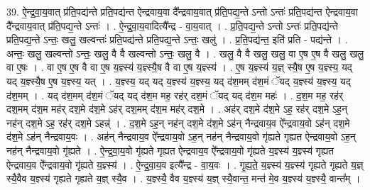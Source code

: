 \documentclass[17pt]{extarticle}
\begin{document}
39. ऐ॒न्द्र॒वा॒य॒वात् प्र॑ति॒पद्य॑न्ते प्रति॒पद्य॑न्त ऐन्द्रवाय॒वा दै᳚न्द्रवाय॒वात् प्र॑ति॒पद्य॒न्ते ऽन्तो ऽन्तः॑ प्रति॒पद्य॑न्त ऐन्द्रवाय॒वा दै᳚न्द्रवाय॒वात् प्र॑ति॒पद्य॒न्ते ऽन्तः॑ । . ऐ॒न्द्र॒वा॒य॒वादित्यै᳚न्द्र - वा॒य॒वात् । . प्र॒ति॒पद्य॒न्ते ऽन्तो ऽन्तः॑ प्रति॒पद्य॑न्ते प्रति॒पद्य॒न्ते ऽन्तः॒ खलु॒ खल्वन्तः॑ प्रति॒पद्य॑न्ते प्रति॒पद्य॒न्ते ऽन्तः॒ खलु॑ । . प्र॒ति॒पद्य॑न्त॒ इति॑ प्रति - पद्य॑न्ते । . अन्तः॒ खलु॒ खल्वन्तो ऽन्तः॒ खलु॒ वै वै खल्वन्तो ऽन्तः॒ खलु॒ वै । . खलु॒ वै वै खलु॒ खलु॒ वा ए॒ष ए॒ष वै खलु॒ खलु॒ वा ए॒षः । . वा ए॒ष ए॒ष वै वा ए॒ष य॒ज्ञ्स्य॑ य॒ज्ञ्स्यै॒ष वै वा ए॒ष य॒ज्ञ्स्य॑ । . ए॒ष य॒ज्ञ्स्य॑ य॒ज्ञ् स्यै॒ष ए॒ष य॒ज्ञ्स्य॒ यद् यद् य॒ज्ञ्स्यै॒ष ए॒ष य॒ज्ञ्स्य॒ यत् । . य॒ज्ञ्स्य॒ यद् यद् य॒ज्ञ्स्य॑ य॒ज्ञ्स्य॒ यद् द॑श॒मम् द॑श॒मं ॅयद् य॒ज्ञ्स्य॑ य॒ज्ञ्स्य॒ यद् द॑श॒मम् । . यद् द॑श॒मम् द॑श॒मं ॅयद् यद् द॑श॒म मह॒ रह॑र् दश॒मं ॅयद् यद् द॑श॒म महः॑ । . द॒श॒म मह॒ रह॑र् दश॒मम् द॑श॒म मह॑र् दश॒मे द॑श॒मे ऽह॑र् दश॒मम् द॑श॒म मह॑र् दश॒मे । . अह॑र् दश॒मे द॑श॒मे ऽह॒ रह॑र् दश॒मे ऽह॒न् नह॑न् दश॒मे ऽह॒ रह॑र् दश॒मे ऽहन्न्॑ । . द॒श॒मे ऽह॒न् नह॑न् दश॒मे द॑श॒मे ऽह॑न् नैन्द्रवाय॒व ऐ᳚न्द्रवाय॒वो ऽह॑न् दश॒मे द॑श॒मे ऽह॑न् नैन्द्रवाय॒वः । . अह॑न् नैन्द्रवाय॒व ऐ᳚न्द्रवाय॒वो ऽह॒न् नह॑न् नैन्द्रवाय॒वो गृ॑ह्यते गृह्यत ऐन्द्रवाय॒वो ऽह॒न् नह॑न् नैन्द्रवाय॒वो गृ॑ह्यते । . ऐ॒न्द्र॒वा॒य॒वो गृ॑ह्यते गृह्यत ऐन्द्रवाय॒व ऐ᳚न्द्रवाय॒वो गृ॑ह्यते य॒ज्ञ्स्य॑ य॒ज्ञ्स्य॑ गृह्यत ऐन्द्रवाय॒व ऐ᳚न्द्रवाय॒वो गृ॑ह्यते य॒ज्ञ्स्य॑ । . ऐ॒न्द्र॒वा॒य॒व इत्यै᳚न्द्र - वा॒य॒वः । . गृ॒ह्य॒ते॒ य॒ज्ञ्स्य॑ य॒ज्ञ्स्य॑ गृह्यते गृह्यते य॒ज्ञ् स्यै॒वैव य॒ज्ञ्स्य॑ गृह्यते गृह्यते य॒ज्ञ् स्यै॒व । . य॒ज्ञ्स्यै॒ वैव य॒ज्ञ्स्य॑ य॒ज्ञ् स्यै॒वान्त॒ मन्त॑ मे॒व य॒ज्ञ्स्य॑ य॒ज्ञ्स्यै॒ वान्त᳚म् । \newline
\pagebreak
{}
\end{document}
